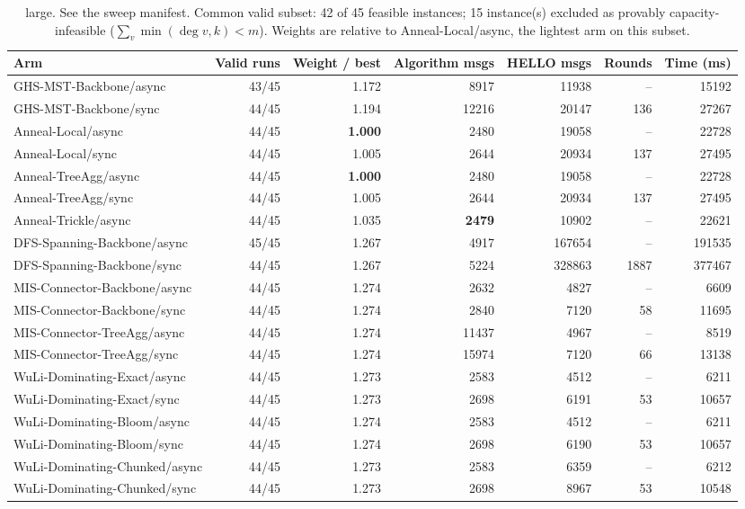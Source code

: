 \begin{table}[tb]
\centering
\caption{large. See the sweep manifest. Common valid subset: 42 of 45 feasible instances; 15 instance(s) excluded as provably capacity-infeasible ($\sum_v \min(\deg v, k) < m$). Weights are relative to Anneal-Local/async, the lightest arm on this subset.}
\label{tab:cmp-large}
\begin{tabular}{lrrrrrr}
\toprule
Arm & Valid runs & Weight / best & Algorithm msgs & HELLO msgs & Rounds & Time (ms) \\
\midrule
GHS-MST-Backbone/async & 43/45 & 1.172 & 8917 & 11938 & -- & 15192 \\
GHS-MST-Backbone/sync & 44/45 & 1.194 & 12216 & 20147 & 136 & 27267 \\
Anneal-Local/async & 44/45 & \textbf{1.000} & 2480 & 19058 & -- & 22728 \\
Anneal-Local/sync & 44/45 & 1.005 & 2644 & 20934 & 137 & 27495 \\
Anneal-TreeAgg/async & 44/45 & \textbf{1.000} & 2480 & 19058 & -- & 22728 \\
Anneal-TreeAgg/sync & 44/45 & 1.005 & 2644 & 20934 & 137 & 27495 \\
Anneal-Trickle/async & 44/45 & 1.035 & \textbf{2479} & 10902 & -- & 22621 \\
DFS-Spanning-Backbone/async & 45/45 & 1.267 & 4917 & 167654 & -- & 191535 \\
DFS-Spanning-Backbone/sync & 44/45 & 1.267 & 5224 & 328863 & 1887 & 377467 \\
MIS-Connector-Backbone/async & 44/45 & 1.274 & 2632 & 4827 & -- & 6609 \\
MIS-Connector-Backbone/sync & 44/45 & 1.274 & 2840 & 7120 & 58 & 11695 \\
MIS-Connector-TreeAgg/async & 44/45 & 1.274 & 11437 & 4967 & -- & 8519 \\
MIS-Connector-TreeAgg/sync & 44/45 & 1.274 & 15974 & 7120 & 66 & 13138 \\
WuLi-Dominating-Exact/async & 44/45 & 1.273 & 2583 & 4512 & -- & 6211 \\
WuLi-Dominating-Exact/sync & 44/45 & 1.273 & 2698 & 6191 & 53 & 10657 \\
WuLi-Dominating-Bloom/async & 44/45 & 1.274 & 2583 & 4512 & -- & 6211 \\
WuLi-Dominating-Bloom/sync & 44/45 & 1.274 & 2698 & 6190 & 53 & 10657 \\
WuLi-Dominating-Chunked/async & 44/45 & 1.273 & 2583 & 6359 & -- & 6212 \\
WuLi-Dominating-Chunked/sync & 44/45 & 1.273 & 2698 & 8967 & 53 & 10548 \\

\end{tabular}
\end{table}
